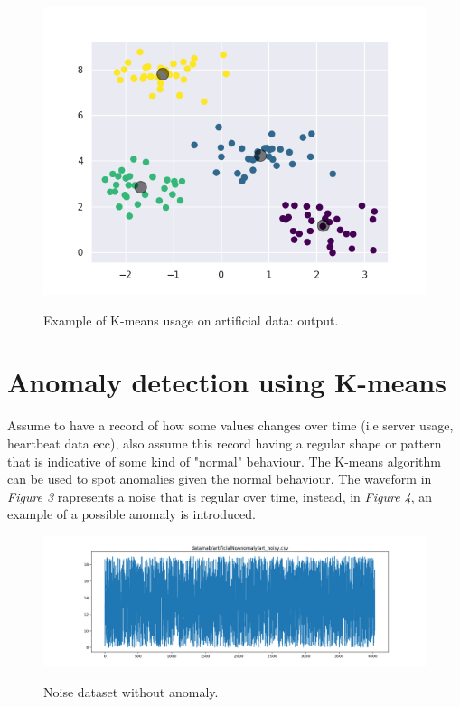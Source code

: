 \documentclass[12pt]{article}
\begin{document}
		\begin{figure}[h!]
			\centering
			\includegraphics[scale=0.60]{img/points_centroid.png}
			\label{fig2}
			\caption{Example of K-means usage on artificial data: output.}
		\end{figure}
\newpage
		
\section{Anomaly detection using K-means}
	Assume to have a record of how some values changes over time (i.e server usage, heartbeat data ecc), also assume this record having a regular shape or pattern that is indicative of some kind of "normal" behaviour. The K-means algorithm can be used to spot anomalies given the normal behaviour. The waveform in \textit{Figure 3}  rapresents a noise that is regular over time, instead, in \textit{Figure 4}, an example of a possible anomaly is introduced.
	
	\begin{figure}[h!]
		\centering
		\includegraphics[scale=0.40]{img/normalbe.png}
		\label{fig3}
		\caption{Noise dataset without anomaly.}
	\end{figure}
	
\end{document}
